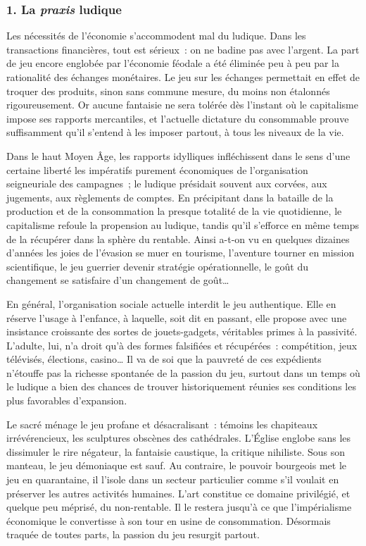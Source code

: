 \documentclass[french,twoside]{book} %
\begin{document}
\subsubsection[{1. La praxis ludique}]{\textsc{1.} La \emph{praxis} ludique}
\noindent Les nécessités de l’économie s’accommodent mal du ludique. Dans les transactions financières, tout est sérieux : on ne badine pas avec l’argent. La part de jeu encore englobée par l’économie féodale a été éliminée peu à peu par la rationalité des échanges monétaires. Le jeu sur les échanges permettait en effet de troquer des produits, sinon sans commune mesure, du moins non étalonnés rigoureusement. Or aucune fantaisie ne sera tolérée dès l’instant où le capitalisme impose ses rapports mercantiles, et l’actuelle dictature du consommable prouve suffisamment qu’il s’entend à les imposer partout, à tous les niveaux de la vie.\par
Dans le haut Moyen Âge, les rapports idylliques infléchissent dans le sens d’une certaine liberté les impératifs purement économiques de l’organisation seigneuriale des campagnes ; le ludique présidait souvent aux corvées, aux jugements, aux règlements de comptes. En précipitant dans la bataille de la production et de la consommation la presque totalité de la vie quotidienne, le capitalisme refoule la propension au ludique, tandis qu’il s’efforce en même temps de la récupérer dans la sphère du rentable. Ainsi a-t-on vu en quelques dizaines d’années les joies de l’évasion se muer en tourisme, l’aventure tourner en mission scientifique, le jeu guerrier devenir stratégie opérationnelle, le goût du changement se satisfaire d’un changement de goût…\par
En général, l’organisation sociale actuelle interdit le jeu authentique. Elle en réserve l’usage à l’enfance, à laquelle, soit dit en passant, elle propose avec une insistance croissante des sortes de jouets-gadgets, véritables primes à la passivité. L’adulte, lui, n’a droit qu’à des formes falsifiées et récupérées : compétition, jeux télévisés, élections, casino… Il va de soi que la pauvreté de ces expédients n’étouffe pas la richesse spontanée de la passion du jeu, surtout dans un temps où le ludique a bien des chances de trouver historiquement réunies ses conditions les plus favorables d’expansion.\par
Le sacré ménage le jeu profane et désacralisant : témoins les chapiteaux irrévérencieux, les sculptures obscènes des cathédrales. L’Église englobe sans les dissimuler le rire négateur, la fantaisie caustique, la critique nihiliste. Sous son manteau, le jeu démoniaque est sauf. Au contraire, le pouvoir bourgeois met le jeu en quarantaine, il l’isole dans un secteur particulier comme s’il voulait en préserver les autres activités humaines. L’art constitue ce domaine privilégié, et quelque peu méprisé, du non-rentable. Il le restera jusqu’à ce que l’impérialisme économique le convertisse à son tour en usine de consommation. Désormais traquée de toutes parts, la passion du jeu resurgit partout.\par
\end{document}
